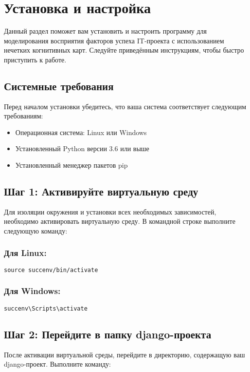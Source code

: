 \documentclass{article}
\begin{document}
    \section{Установка и настройка}
    Данный раздел поможет вам установить и настроить программу для моделирования восприятия факторов успеха IT-проекта с использованием нечетких когнитивных карт. Следуйте приведённым инструкциям, чтобы быстро приступить к работе.

    \subsection{Системные требования}
    Перед началом установки убедитесь, что ваша система соответствует следующим требованиям:
    \begin{itemize}
        \item Операционная система: Linux или Windows
        \item Установленный Python версии 3.6 или выше
        \item Установленный менеджер пакетов pip
    \end{itemize}

    \subsection{Шаг 1: Активируйте виртуальную среду}
    Для изоляции окружения и установки всех необходимых зависимостей, необходимо активировать виртуальную среду. В командной строке выполните следующую команду:
    \subsubsection{Для Linux:}
    \begin{verbatim}
source succenv/bin/activate
    \end{verbatim}

    \subsubsection{Для Windows:}
    \begin{verbatim}
succenv\Scripts\activate
    \end{verbatim}

    \subsection{Шаг 2: Перейдите в папку django-проекта}
    После активации виртуальной среды, перейдите в директорию, содержащую ваш django-проект. Выполните команду:
\end{document}
